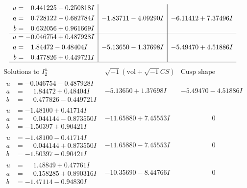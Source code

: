 \documentclass[1p]{elsarticle_modified}
\theoremstyle{definition}
\newcommand{\I}{\sqrt{-1}}
\begin{document}
$$\begin{array}{c|c|c}
\begin{aligned}
u &= \phantom{-}0.441225 - 0.250818 I \\
a &= \phantom{-}0.728122 - 0.682784 I \\
b &= \phantom{-}0.632056 + 0.961669 I\end{aligned}
 & -1.83711 - 4.09290 I & -6.11412 + 7.37496 I \\ \hline\begin{aligned}
u &= -0.046754 + 0.487928 I \\
a &= \phantom{-}1.84472 - 0.48404 I \\
b &= \phantom{-}0.477826 + 0.449721 I\end{aligned}
 & -5.13650 - 1.37698 I & -5.49470 + 4.51886 I\\
 \hline 
 \end{array}$$\newpage$$\begin{array}{c|c|c}  
\text{Solutions to }I^u_{2}& \I (\text{vol} + \sqrt{-1}CS) & \text{Cusp shape}\\
 \hline 
\begin{aligned}
u &= -0.046754 - 0.487928 I \\
a &= \phantom{-}1.84472 + 0.48404 I \\
b &= \phantom{-}0.477826 - 0.449721 I\end{aligned}
 & -5.13650 + 1.37698 I & -5.49470 - 4.51886 I \\ \hline\begin{aligned}
u &= -1.48100 + 0.41714 I \\
a &= \phantom{-}0.044144 - 0.873550 I \\
b &= -1.50397 + 0.90421 I\end{aligned}
 & -11.65880 + 7.45553 I & \phantom{-0.000000 } 0 \\ \hline\begin{aligned}
u &= -1.48100 - 0.41714 I \\
a &= \phantom{-}0.044144 + 0.873550 I \\
b &= -1.50397 - 0.90421 I\end{aligned}
 & -11.65880 - 7.45553 I & \phantom{-0.000000 } 0 \\ \hline\begin{aligned}
u &= \phantom{-}1.48849 + 0.47761 I \\
a &= \phantom{-}0.158285 + 0.890316 I \\
b &= -1.47114 - 0.94830 I\end{aligned}
 & -10.35690 - 8.44766 I & \phantom{-0.000000 } 0 \\ \hline\begin{aligned}

\end{aligned}
\end{array}$$
\end{document}
